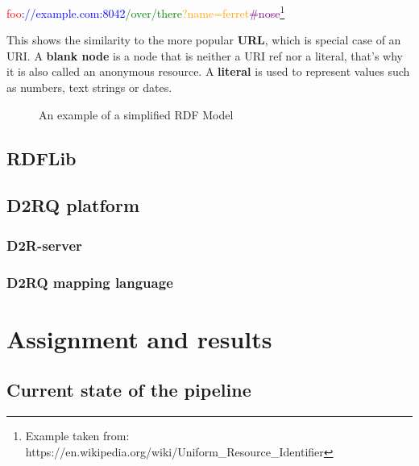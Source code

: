 \documentclass[english]{ttlab-qualify}
\begin{document}
\begin{center}
    \textcolor{red}{foo}\textcolor{blue}{://example.com:8042}\textcolor{green}{/over/there}\textcolor{orange}{?name=ferret}\textcolor{purple}{\#nose}\footnote[6]{Example taken from: https://en.wikipedia.org/wiki/Uniform\_Resource\_Identifier}
\end{center}
This shows the similarity to the more popular \textbf{URL}, which is special case of an URI.
A \textbf{blank node} is a node that is neither a URI ref nor a literal, that's why it is also called an anonymous resource. A \textbf{literal} is used to represent  values such as numbers, text strings or dates.
\begin{center}
    \begin{figure}
        \centering
        \caption{An example of a simplified RDF Model}
    \end{figure}
\end{center}

\section{RDFLib}
\section{D2RQ platform}
\subsection{D2R-server}
\subsection{D2RQ mapping language}

\chapter{Assignment and results}
\section{Current state of the pipeline}
\end{document}
